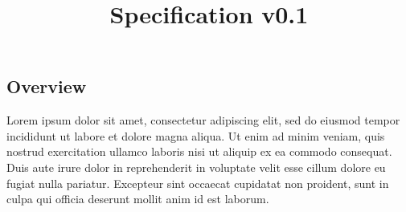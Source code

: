 \documentclass{myfuntestdoc}
\title{Specification v0.1}
\begin{document}
\frontmatter

\begin{titlepage}

  \section*{Overview}
  Lorem ipsum dolor sit amet, consectetur adipiscing elit, sed do
  eiusmod tempor incididunt ut labore et dolore magna aliqua. Ut enim
  ad minim veniam, quis nostrud exercitation ullamco laboris nisi ut
  aliquip ex ea commodo consequat. Duis aute irure dolor in
  reprehenderit in voluptate velit esse cillum dolore eu fugiat nulla
  pariatur. Excepteur sint occaecat cupidatat non proident, sunt in
  culpa qui officia deserunt mollit anim id est laborum.
\end{titlepage}

\tableofcontents
\listoftables
\listoffigures

\mainmatter
\end{document}
